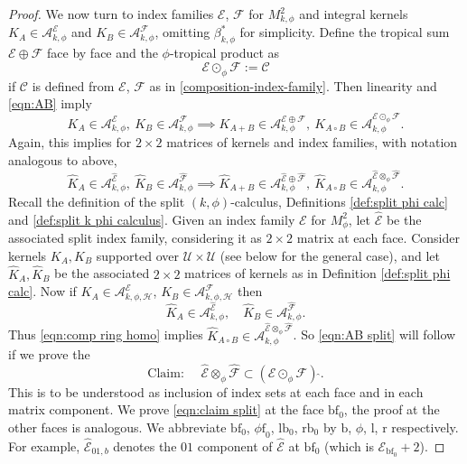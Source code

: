 \documentclass[11pt]{article}
\numberwithin{equation}{section}
\theoremstyle{plain}
\theoremstyle{definition}
\newcommand{\Umath}{{\mathscr{U}}}
\newcommand{\Cmath}{{\mathscr{C}}}
\newcommand{\Hmath}{{\mathscr{H}}}
\newcommand\calA{{\mathcal A}}
\newcommand\calE{{\mathcal E}}
\newcommand\calF{{\mathcal F}}
\newcommand{\calEwhat}{{\widehat{\calE}}}
\newcommand{\calFwhat}{{\widehat{\calF}}}
\newcommand{\phif}{{\phi\mathrm{f}}}
\newcommand{\lf}{{\mathrm{lb}}}
\newcommand{\rf}{{\mathrm{rb}}}
\newcommand{\bb}{{\mathrm{b}}}
\renewcommand{\ll}{{\mathrm{l}}}
\newcommand{\rr}{{\mathrm{r}}}
\newcommand{\bbf}{{\mathrm{bf}}}
\newcommand{\bbfz}{{\bbf_0}}
\newcommand{\Kwhat}{{\widehat{K}}}
\begin{document}
\begin{proof}
We now turn to index families $\calE$, $\calF$ for $M^2_{k,\phi}$ and integral kernels
$K_A\in\calA^\calE_{k,\phi}$ and $K_B\in\calA^\calF_{k,\phi}$, omitting $\beta_{k,\phi}^*$ for simplicity. Define the tropical sum
$\calE\oplus\calF$ face by face and the $\phi$-tropical product as
\begin{equation}
\label{eqn:def odot phi}
\calE \odot_\phi \calF := \Cmath
\end{equation}
if $\Cmath$ is defined from $\calE$, $\calF$ as in \eqref{composition-index-family}.
Then linearity and \eqref{eqn:AB} imply
\[
K_A\in \calA^\calE_{k,\phi},\ K_B \in \calA^\calF_{k,\phi} \implies
K_{A+B} \in \calA_{k,\phi}^{\calE\oplus\calF},\ K_{A\circ B}\in\calA_{k,\phi}^{\calE\odot_\phi \calF}.
\]
Again, this implies for $2\times2$ matrices of kernels and index families, with notation analogous to above,
\begin{equation}
\label{eqn:comp ring homo}
\Kwhat_A\in \calA_{k,\phi}^\calEwhat,\ \Kwhat_B \in \calA_{k,\phi}^\calFwhat \implies
\Kwhat_{A+B} \in \calA_{k,\phi}^{\calEwhat\oplus\calFwhat},\ \Kwhat_{A\circ B}\in\calA_{k,\phi}^{\calEwhat\otimes_\phi \calFwhat}.
\end{equation}
Recall the definition of the split $(k,\phi)$-calculus, Definitions \ref{def:split phi calc} and \ref{def:split k phi calculus}.
Given an index family $\calE$ for $M^2_\phi$, let $\calEwhat$ be the associated split index family, considering it as $2\times2$ matrix at each face.
Consider kernels $K_A,K_B$ supported over $\Umath\times\Umath$ (see below for the general case), and let $\Kwhat_A,\Kwhat_B$ be the associated $2\times2$ matrices of kernels as in Definition \ref{def:split phi calc}.
Now if $K_A\in \calA^\calE_{k,\phi,\Hmath}$, $K_{B} \in\calA^\calF_{k,\phi,\Hmath}$
then\vspace*{-3pt}
\[
\Kwhat_A\in\calA^\calEwhat_{k,\phi}, \quad \Kwhat_B\in\calA^\calFwhat_{k,\phi}.
\]
Thus \eqref{eqn:comp ring homo} implies $\Kwhat_{A\circ B}\in \calA^{\calEwhat\otimes_\phi \calFwhat}_{k,\phi}$.
So \eqref{eqn:AB split} will follow if we prove the\vspace*{-3pt}
\begin{equation}
\label{eqn:claim split}
\text{Claim: }\quad \calEwhat \otimes_\phi \calFwhat \subset (\calE \odot_\phi\calF)\,\widehat{}.
\end{equation}
This is to be understood as inclusion of index sets at each face and in each matrix component. We prove \eqref{eqn:claim split} at the face $\bbf_0$, the proof at the other faces is analogous. We abbreviate $\bbf_0$, $\phif_0$, $\lf_0$, $\rf_0$ by $\bb$, $\phi$, $\ll$, $\rr$ respectively. For example, $\calEwhat_{01,b}$ denotes the $01$ component of $\calEwhat$ at $\bbf_0$ (which is $\calE_\bbfz+2$).


\end{proof}
\end{document}
